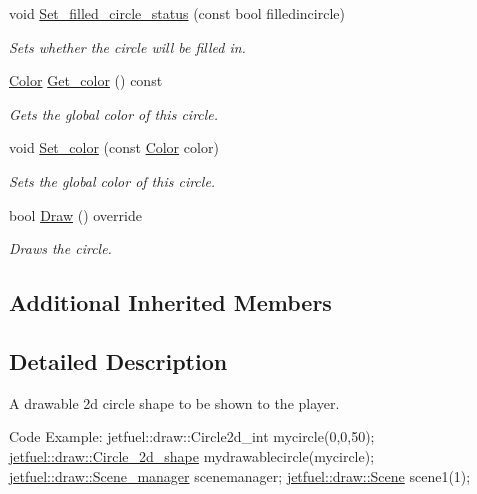 \begin{DoxyCompactItemize}
void \hyperlink{classjetfuel_1_1draw_1_1Circle__2d__shape_a027d4640ee52708f5fa853f20ba2f899}{Set\+\_\+filled\+\_\+circle\+\_\+status} (const bool filledincircle)
\begin{DoxyCompactList}\small\item\em Sets whether the circle will be filled in. \end{DoxyCompactList}\item 
\hyperlink{classjetfuel_1_1draw_1_1Color}{Color} \hyperlink{classjetfuel_1_1draw_1_1Circle__2d__shape_ad7953fa383fdffedf6cdf9d6a3d9a1bb}{Get\+\_\+color} () const
\begin{DoxyCompactList}\small\item\em Gets the global color of this circle. \end{DoxyCompactList}\item 
void \hyperlink{classjetfuel_1_1draw_1_1Circle__2d__shape_a20ac0647e90c629f347e3c65a0315220}{Set\+\_\+color} (const \hyperlink{classjetfuel_1_1draw_1_1Color}{Color} color)
\begin{DoxyCompactList}\small\item\em Sets the global color of this circle. \end{DoxyCompactList}\item 
bool \hyperlink{classjetfuel_1_1draw_1_1Circle__2d__shape_a8be660f3cd624dc077d9003ee3b37212}{Draw} () override
\begin{DoxyCompactList}\small\item\em Draws the circle. \end{DoxyCompactList}\end{DoxyCompactItemize}
\subsection*{Additional Inherited Members}


\subsection{Detailed Description}
A drawable 2d circle shape to be shown to the player.

Code Example\+: jetfuel\+::draw\+::\+Circle2d\+\_\+int mycircle(0,0,50); \hyperlink{classjetfuel_1_1draw_1_1Circle__2d__shape}{jetfuel\+::draw\+::\+Circle\+\_\+2d\+\_\+shape} mydrawablecircle(mycircle); \hyperlink{classjetfuel_1_1draw_1_1Scene__manager}{jetfuel\+::draw\+::\+Scene\+\_\+manager} scenemanager; \hyperlink{classjetfuel_1_1draw_1_1Scene}{jetfuel\+::draw\+::\+Scene} scene1(1);

